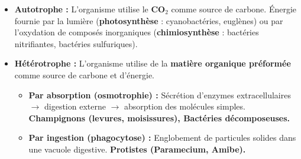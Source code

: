\documentclass[11pt]{article}
\begin{document}
\begin{definition}
    \begin{itemize}
        \item \textbf{Autotrophe :} L'organisme utilise le \textbf{CO$_2$} comme source de carbone. Énergie fournie par la lumière (\textbf{photosynthèse} : cyanobactéries, euglènes) ou par l'oxydation de composés inorganiques (\textbf{chimiosynthèse} : bactéries nitrifiantes, bactéries sulfuriques).
        \item \textbf{Hétérotrophe :} L'organisme utilise de la \textbf{matière organique préformée} comme source de carbone et d'énergie.
              \begin{itemize}
                  \item \textbf{Par absorption (osmotrophie) :} Sécrétion d'enzymes extracellulaires $\rightarrow$ digestion externe $\rightarrow$ absorption des molécules simples. \textbf{Champignons (levures, moisissures), Bactéries décomposeuses.}
                  \item \textbf{Par ingestion (phagocytose) :} Englobement de particules solides dans une vacuole digestive. \textbf{Protistes (Paramecium, Amibe).}
              \end{itemize}
    \end{itemize}
\end{definition}
\end{document}
